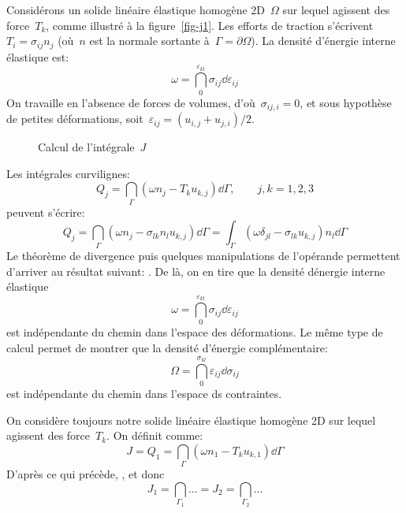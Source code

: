 Considérons un solide linéaire élastique homogène 2D~$\Omega$ sur lequel agissent des force~$T_k$, comme
illustré à la figure~\ref{fig-j1}.
Les efforts de traction s'écrivent~$T_i=\sigma_{ij}n_j$ (où~$n$ est la normale sortante à~$\Gamma=\partial\Omega$).
La densité d'énergie interne élastique est:
\begin{equation}
\omega=\dint_0^{\varepsilon_{kl}} \sigma_{ij}\dd\varepsilon_{ij}
\end{equation}
On travaille en l'absence de forces de volumes, d'où~$\sigma_{ij,i}=0$, et sous hypothèse de petites déformations, soit~$\varepsilon_{ij}=(u_{i,j}+u_{j,i})/2$.
\begin{figure}[ht]
\centering
{}\hspace{5em}
\caption{Calcul de l'intégrale~$J$}
\end{figure}
Les intégrales curvilignes:
\begin{equation}
Q_j =\dint_\Gamma \left(\omega n_j- T_k u_{k,j}\right)\dd\Gamma,\qquad j, k=1,2,3
\end{equation}
peuvent s'écrire:
\begin{equation}
Q_j =\dint_\Gamma \left(\omega n_j- \sigma_{lk}n_l u_{k,j}\right)\dd\Gamma
=\int_\Gamma \left(\omega \delta_{jl}- \sigma_{lk} u_{k,j}\right)n_l \dd\Gamma
\end{equation}
Le théorème de divergence puis quelques manipulations de l'opérande permettent d'arriver au résultat
suivant: . De là, on en tire que la densité dénergie interne élastique
\begin{equation}\omega=\dint_0^{\varepsilon_{kl}} \sigma_{ij}\dd\varepsilon_{ij}\end{equation}
est indépendante du chemin dans l'espace des déformations.
Le même type de calcul permet de montrer que la densité d'énergie complémentaire:
\begin{equation}\Omega = \dint_0^{\sigma_{kl}} \varepsilon_{ij}\dd\sigma_{ij}\end{equation}
est indépendante du chemin dans l'espace ds contraintes.

\medskip
On considère toujours notre solide linéaire élastique homogène 2D sur lequel agissent des
force~$T_k$. On définit  comme:
\begin{equation} J = Q_1 =\dint_\Gamma \left(\omega n_1- T_k u_{k,1}\right)\dd\Gamma \end{equation}
D'après ce qui précède, , et donc
\begin{equation}J_1=\dint_{\Gamma_1} ... = J_2=\dint_{\Gamma_2} ...\end{equation}


